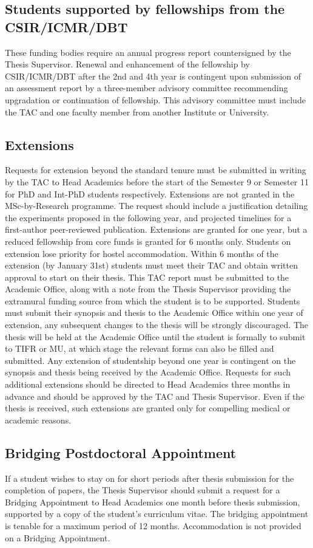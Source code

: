 \documentclass[a4paper]{extarticle}
\begin{document}
\subsection{Students supported by fellowships from the CSIR/ICMR/DBT} These funding bodies
require an annual progress report countersigned by the Thesis Supervisor. Renewal and
enhancement of the fellowship by CSIR/ICMR/DBT after the 2nd and 4th year is contingent
upon submission of an assessment report by a three-member advisory committee
recommending upgradation or continuation of fellowship. This advisory committee must
include the TAC and one faculty member from another Institute or University.

\subsection{Extensions} Requests for extension beyond the standard tenure must be submitted in writing
by the TAC to Head Academics before the start of the Semester 9 or Semester 11 for PhD
and Int-PhD students respectively. Extensions are not granted in the MSc-by-Research
programme. The request should include a justification detailing the experiments proposed in
the following year, and projected timelines for a first-author peer-reviewed publication.
Extensions are granted for one year, but a reduced fellowship from core funds is granted for
6 months only. Students on extension lose priority for hostel accommodation. Within 6
months of the extension (by January 31st) students must meet their TAC and obtain written
approval to start on their thesis. This TAC report must be submitted to the Academic Office,
along with a note from the Thesis Supervisor providing the extramural funding source from
which the student is to be supported. Students must submit their synopsis and thesis to the
Academic Office within one year of extension, any subsequent changes to the thesis will be
strongly discouraged. The thesis will be held at the Academic Office until the student is
formally to submit to TIFR or MU, at which stage the relevant forms can also be filled and
submitted. Any extension of studentship beyond one year is contingent on the synopsis and
thesis being received by the Academic Office. Requests for such additional extensions
should be directed to Head Academics three months in advance and should be approved by
the TAC and Thesis Supervisor. Even if the thesis is received, such extensions are granted
only for compelling medical or academic reasons.

\subsection{Bridging Postdoctoral Appointment}
If a student wishes to stay on for short periods after
thesis submission for the completion of papers, the Thesis Supervisor should submit a
request for a Bridging Appointment to Head Academics one month before thesis
submission, supported by a copy of the student’s curriculum vitae. The bridging
appointment is tenable for a maximum period of 12 months. Accommodation is not
provided on a Bridging Appointment.
\end{document}
